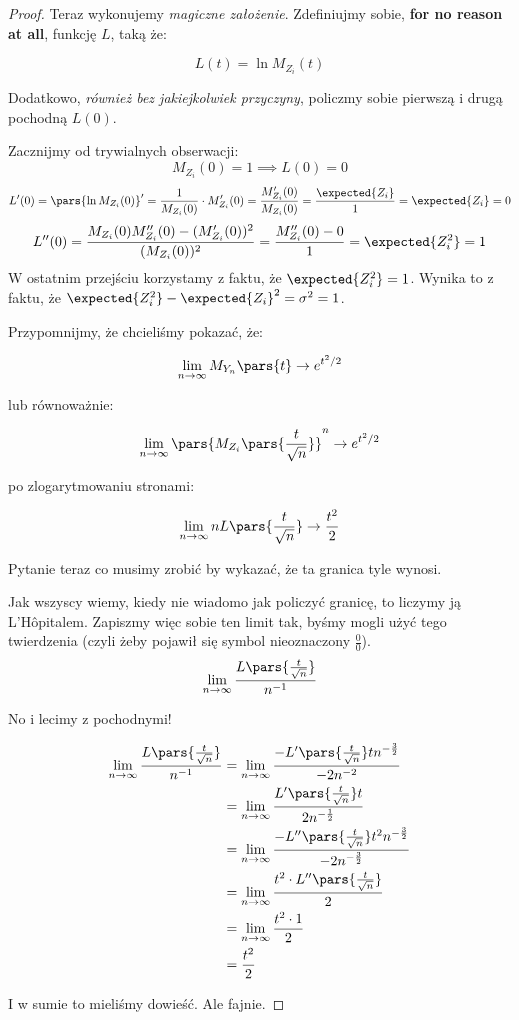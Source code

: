 \begin{proof}
    Teraz wykonujemy \textit{magiczne założenie}. Zdefiniujmy sobie, \textbf{for no reason at all}, funkcję \(L\), taką że:
    
    \[
        L(t) = \ln M_{Z_i}(t)
    \]
    
    Dodatkowo, \textit{również bez jakiejkolwiek przyczyny}, policzmy sobie pierwszą i drugą pochodną \(L(0)\). 
    
    Zacznijmy od trywialnych obserwacji:
    \[
    M_{Z_i}(0) = 1 \implies L(0) = 0
    \]
    \[
    L'(0) = \pars{\ln M_{Z_i}(0)}' = \frac{1}{M_{Z_i}(0)} \cdot M'_{Z_i}(0) = \frac{M_{Z_i}'(0)}{M_{Z_i}(0)} = \frac{\expected{Z_i}}{1} = \expected{Z_i} = 0
    \]
    \[
    L''(0) = \frac{M_{Z_i}(0)M_{Z_i}''(0) - (M_{Z_i}'(0))^2}{(M_{Z_i}(0))^2} = \frac{M_{Z_i}''(0) - 0}{1} = \expected{Z_i^2} = 1
    \]
    W ostatnim przejściu korzystamy z faktu, że \( \expected{Z_{i}^2} = 1\). Wynika to z faktu, że \( \expected{Z_{i}^2} - \expected{Z_{i}}^2 = \sigma^2 = 1\).
    
    Przypomnijmy, że chcieliśmy pokazać, że:
    
    
    \[
    \lim_{n\to\infty}M_{Y_n}\pars{t} \to e^{t^2/2}
    \]
    
    lub równoważnie:
    
    \[ 
        \lim_{n \to \infty } \pars{M_{Z_i}\pars{\frac{t}{\sqrt{n}}}}^n \to e^{t^2 / 2}
    \]
    
    po zlogarytmowaniu stronami:
    
    \[ 
        \lim_{n \to \infty} nL\pars{\frac{t}{\sqrt{n}}} \to \frac{t^2}{2}
    \]
    
    Pytanie teraz co musimy zrobić by wykazać, że ta granica tyle wynosi. 
    
    Jak wszyscy wiemy, kiedy nie wiadomo jak policzyć granicę, to liczymy ją L’Hôpitalem. Zapiszmy więc sobie ten limit tak, byśmy mogli użyć tego twierdzenia (czyli żeby pojawił się symbol nieoznaczony \( \frac{0}{0} \)).
    \[
    \lim_{n \to \infty}\frac{L\pars{\frac{t}{\sqrt{n}}}}{n^{-1}}
    \]
    
    No i lecimy z pochodnymi!
    
    \begin{align*}
        \lim_{n \to \infty}\frac{L \pars{\frac{t}{\sqrt{n}}}}{n^{-1}} &= \lim_{n \to \infty}\frac{-L'\pars{\frac{t}{\sqrt{n}}}tn^{-\frac{3}{2}}}{-2n^{-2}} \\
        &= \lim_{n \to \infty}\frac{L'\pars{\frac{t}{\sqrt{n}}}t}{2n^{-\frac{1}{2}}} \\ 
        &= \lim_{n \to \infty}\frac{-L''\pars{\frac{t}{\sqrt{n}}}t^2 n^{-\frac{3}{2}}}{-2n^{-\frac{3}{2}}} \\ 
        &= \lim_{n \to \infty} \frac{t^2 \cdot L''\pars{\frac{t}{\sqrt{n}}}}{2} \\ 
        &= \lim_{n \to \infty} \frac{t^2 \cdot 1 }{2} \\
        &= \frac{t^2}{2}
    \end{align*}
        
    I w sumie to mieliśmy dowieść. Ale fajnie. 
\end{proof}